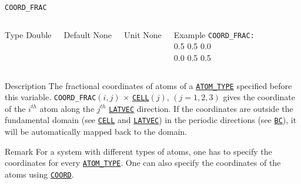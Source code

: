\documentclass[xcolor=dvipsnames,t]{beamer}
\begin{document}
\begin{frame}[allowframebreaks]{\texttt{COORD\_FRAC}} \label{COORD_FRAC}
\vspace*{-12pt}
\begin{columns}
\begin{block}{Type}
Double
\end{block}

\begin{block}{Default}
None
\end{block}

\begin{block}{Unit}
None
\end{block}

\begin{block}{Example}
\texttt{COORD\_FRAC: \\}
0.5 0.5 0.0 \\
0.0 0.5 0.5
\end{block}
\end{columns}

\begin{block}{Description}
The fractional coordinates of atoms of a \hyperlink{ATOM_TYPE}{\texttt{ATOM\_TYPE}} specified before this variable. \texttt{COORD\_FRAC}$(i,j)$ $\times$ \hyperlink{CELL}{\texttt{CELL}}$(j)$, $(j = 1,2,3)$ gives the coordinate of the $i^{th}$ atom along the $j^{th}$ \hyperlink{LATVEC}{\texttt{LATVEC}} direction. If the coordinates are outside the fundamental domain (see \hyperlink{CELL}{\texttt{CELL}} and \hyperlink{LATVEC}{\texttt{LATVEC}}) in the periodic directions (see \hyperlink{BC}{\texttt{BC}}), it will be automatically mapped back to the domain.
\end{block}

\begin{block}{Remark}
For a system with different types of atoms, one has to specify the coordinates for every \hyperlink{ATOM_TYPE}{\texttt{ATOM\_TYPE}}. One can also specify the coordinates of the atoms using \hyperlink{COORD}{\texttt{COORD}}.
\end{block}

\end{frame}
\end{document}
